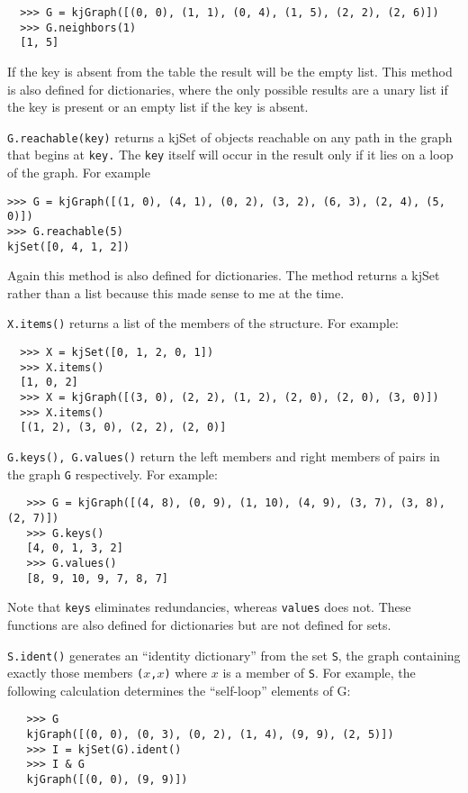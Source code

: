 \begin{description}
\begin{verbatim}
  >>> G = kjGraph([(0, 0), (1, 1), (0, 4), (1, 5), (2, 2), (2, 6)])
  >>> G.neighbors(1)
  [1, 5]
\end{verbatim}
If the key is absent from the table the result will be the empty
list.
This method is also defined for dictionaries, where the only possible
results are a unary list if the key is present or an empty list if
the key is absent.
%
\item{\tt G.reachable(key)}
returns a kjSet of objects reachable on any path in the graph
that begins at {\tt key.}  The {\tt key} itself will occur in the
result only if it lies on a loop of the graph.  For example
\begin{verbatim}
>>> G = kjGraph([(1, 0), (4, 1), (0, 2), (3, 2), (6, 3), (2, 4), (5, 0)])
>>> G.reachable(5)
kjSet([0, 4, 1, 2])
\end{verbatim}
Again this method is also defined for dictionaries.  The method
returns a kjSet rather than a list because this made sense to me at
the time.
%
\item{\tt X.items()}
returns a list of the members of the structure.  For example:
\begin{verbatim}
  >>> X = kjSet([0, 1, 2, 0, 1])
  >>> X.items()
  [1, 0, 2]
  >>> X = kjGraph([(3, 0), (2, 2), (1, 2), (2, 0), (2, 0), (3, 0)])
  >>> X.items()
  [(1, 2), (3, 0), (2, 2), (2, 0)]
\end{verbatim}
\item{\tt G.keys(), G.values()}
return the left members and right members of pairs in the graph 
{\tt G} respectively.  For example:
\begin{verbatim}
   >>> G = kjGraph([(4, 8), (0, 9), (1, 10), (4, 9), (3, 7), (3, 8), (2, 7)])
   >>> G.keys()
   [4, 0, 1, 3, 2]
   >>> G.values()
   [8, 9, 10, 9, 7, 8, 7]
\end{verbatim}
Note that {\tt keys} eliminates redundancies, whereas {\tt values}
does not.
These functions are also defined for
dictionaries but are not defined for sets.  
%
\item{\tt S.ident()}
generates an ``identity dictionary'' from the set {\tt S}, the graph
containing exactly those members {\tt ($x$,$x$)} where $x$ is 
a member of {\tt S}.  For example, the following calculation
determines the ``self-loop'' elements of G:
\begin{verbatim}
   >>> G
   kjGraph([(0, 0), (0, 3), (0, 2), (1, 4), (9, 9), (2, 5)])
   >>> I = kjSet(G).ident()
   >>> I & G
   kjGraph([(0, 0), (9, 9)])
\end{verbatim}

\end{description}
